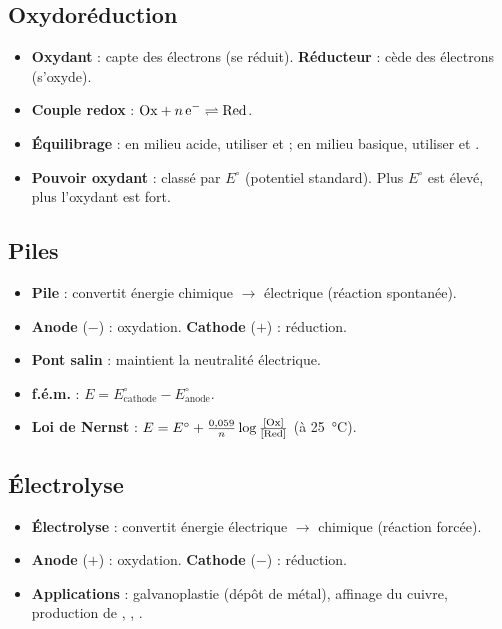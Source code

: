 \begin{synthese}
\subsection*{Oxydoréduction}
\begin{itemize}
    \item \textbf{Oxydant} : capte des électrons (se réduit). \textbf{Réducteur} : cède des électrons (s'oxyde).
    \item \textbf{Couple redox} : $\ox + n\,\ce{e-} \rightleftharpoons \red$.
    \item \textbf{Équilibrage} : en milieu acide, utiliser  et  ; en milieu basique, utiliser  et .
    \item \textbf{Pouvoir oxydant} : classé par $E^\circ$ (potentiel standard). Plus $E^\circ$ est élevé, plus l'oxydant est fort.
\end{itemize}

\subsection*{Piles}
\begin{itemize}
    \item \textbf{Pile} : convertit énergie chimique $\rightarrow$ électrique (réaction spontanée).
    \item \textbf{Anode} ($-$) : oxydation. \textbf{Cathode} ($+$) : réduction.
    \item \textbf{Pont salin} : maintient la neutralité électrique.
    \item \textbf{f.é.m.} : $E = E^\circ_{\text{cathode}} - E^\circ_{\text{anode}}$.
    \item \textbf{Loi de Nernst} : $E = E^\circ + \frac{0,059}{n} \log \frac{[\mathrm{Ox}]}{[\mathrm{Red}]}$ (à \SI{25}{\celsius}).
\end{itemize}

\subsection*{Électrolyse}
\begin{itemize}
    \item \textbf{Électrolyse} : convertit énergie électrique $\rightarrow$ chimique (réaction forcée).
    \item \textbf{Anode} ($+$) : oxydation. \textbf{Cathode} ($-$) : réduction.
    \item \textbf{Applications} : galvanoplastie (dépôt de métal), affinage du cuivre, production de , , .
\end{itemize}


\end{synthese}
